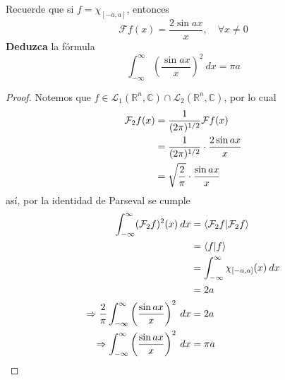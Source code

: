 \documentclass[12pt]{report}
\theoremstyle{largebreak}
\newcommand\pint[2]{\ensuremath{\langle#1| #2\rangle}}
\newcommand{\fou}[1]{\ensuremath{\mathcal{F}#1}}
\begin{document}
    \begin{excer}
        Recuerde que si $f=\chi_{[-a,a]}$, entonces
        \begin{equation*}
            \fou{f}(x)=\frac{2\sin ax}{x},\quad\forall x\neq0
        \end{equation*}
        \textbf{Deduzca} la fórmula
        \begin{equation*}
            \int_{ -\infty}^{\infty}\left(\frac{\sin ax}{x} \right)^2\:dx=\pi a
        \end{equation*}
    \end{excer}

    \begin{proof}
        Notemos que $f\in\mathcal{L}_1(\mathbb{R}^n,\mathbb{C})\cap\mathcal{L}_2(\mathbb{R}^n,\mathbb{C})$, por lo cual
        \begin{equation*}
            \begin{split}
                \fou_2{f}(x)&=\frac{1}{(2\pi)^{1/2}}\fou{f}(x)\\
                &=\frac{1}{(2\pi)^{1/2}}\cdot\frac{2\sin ax}{x}\\
                &=\sqrt{\frac{2}{\pi}}\cdot\frac{\sin ax}{x}\\
            \end{split}
        \end{equation*}
        así, por la identidad de Parseval se cumple
        \begin{equation*}
            \begin{split}
                \int_{-\infty}^{\infty}(\fou_2{f})^2(x)\:dx&=\pint{\fou_2{f}}{\fou_2{f}}\\
                &=\pint{f}{f}\\
                &=\int_{-\infty}^\infty \chi_{[-a,a]}(x)\:dx\\
                &=2a\\
                \Rightarrow \frac{2}{\pi}\int_{ -\infty}^\infty\left(\frac{\sin ax}{x}\right)^2 \:dx&=2a\\
                \Rightarrow \int_{ -\infty}^\infty\left(\frac{\sin ax}{x}\right)^2\:dx&=\pi a\\
            \end{split}
        \end{equation*}
    \end{proof}
\end{document}
